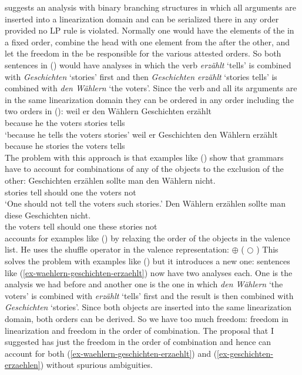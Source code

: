 \documentclass[output=paper]{langsci/langscibook}
\begin{document}
\citet{Kathol2000a} suggests an analysis with binary branching structures in which all arguments are
inserted into a linearization domain and can be serialized there in any order provided no LP rule is
violated. Normally one would have the elements of the \compsl in a fixed order, combine the head
with one element from the \compsl after the other, and let the freedom in the \doml be responsible
for the various attested orders. So both sentences in () would have analyses in which the
verb \emph{erzählt} `tells' is combined with \emph{Geschichten} `stories' first and then
\emph{Geschichten erzählt} `stories tells' is combined with \emph{den Wählern} `the voters'. Since
the verb and all its arguments are in the same linearization domain they can be ordered in any order including the two orders in ():
\eal
\label{ex-waehlern-geschichten-erzaehlt}
\ex 
\gll weil er den Wählern Geschichten erzählt\\
     because he the voters stories tells\\\german
\glt `because he tells the voters stories'
\ex 
\gll weil er Geschichten den Wählern erzählt\\
     because he stories the voters tells\\
\zl
The problem with this approach is that examples like () show that grammars have to account
for combinations of any of the objects to the exclusion of the other:
\eal
\label{ex-geschichten-erzaehlen}
\ex 
\gll Geschichten erzählen sollte man den Wählern nicht.\\
     stories     tell     should one the voters not\\\german
\glt `One should not tell the voters such stories.'
\ex 
\gll Den Wählern erzählen sollte man diese Geschichten nicht.\\
     the voters  tell     should one these stories not\\
\zl
\citet[Section~8.9]{Kathol2000a} accounts for examples like () by relaxing the order of the objects in the
valence list. He uses the shuffle operator in the valence representation:
\ea
{} $\oplus$ ( $\bigcirc$ )
\z
This solves the problem with examples like () but it introduces a new one: sentences like
(\ref{ex-waehlern-geschichten-erzaehlt}) now have two analyses each. One is the analysis we had before and another one is the one
in which \emph{den Wählern} `the voters' is combined with \emph{erzählt} `tells' first and the result is then combined
with \emph{Geschichten} `stories'. Since both objects are inserted into the same linearization domain, both
orders can be derived. So we have too much freedom: freedom in linearization and freedom in the
order of combination. The proposal that I suggested has just the freedom in the order of combination
and hence can account for both (\ref{ex-waehlern-geschichten-erzaehlt}) and
(\ref{ex-geschichten-erzaehlen}) without spurious ambiguities.
\end{document}
